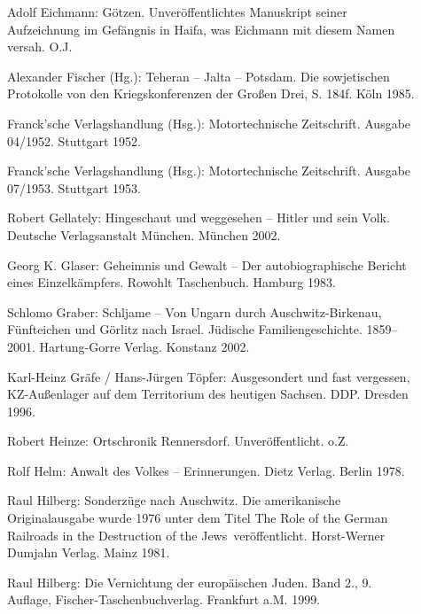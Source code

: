 \documentclass[a4paper,12pt,ngerman,
]{nisebook}
\begin{document}
\begin{description}
\item[]{Adolf Eichmann: \glqq Götzen\grqq. Unveröffentlichtes Manuskript seiner Aufzeichnung im Gefängnis in Haifa, was Eichmann mit diesem Namen versah. O.J.} 

\item[] {Alexander Fischer (Hg.): Teheran -- Jalta -- Potsdam. Die sowjetischen Protokolle von den Kriegskonferenzen der Großen Drei, S. 184f. Köln 1985.}

\item[]{Franck'sche Verlagshandlung (Hsg.): \glqq Motortechnische Zeitschrift\grqq. Ausgabe 04/1952. Stuttgart 1952.}

\item[]{Franck'sche Verlagshandlung (Hsg.): \glqq Motortechnische Zeitschrift\grqq. Ausgabe 07/1953. Stuttgart 1953.}

\item[]{Robert Gellately: \glqq Hingeschaut und weggesehen -- Hitler und sein Volk\grqq. Deutsche Verlagsanstalt München. München 2002.}

\item[]{Georg K. Glaser: \glqq Geheimnis und Gewalt -- Der autobiographische Bericht eines Einzelkämpfers\grqq. Rowohlt Taschenbuch. Hamburg 1983.}

\item[]{Schlomo Graber: \glqq Schljame -- Von Ungarn durch Auschwitz-Birkenau, Fünfteichen und Görlitz nach Israel. Jüdische Familiengeschichte. 1859--2001\grqq. Hartung-Gorre Verlag. Konstanz 2002.}

\item[]{Karl-Heinz Gräfe / Hans-Jürgen Töpfer: \glqq Ausgesondert und fast vergessen, KZ-Außenlager auf dem Territorium des heutigen Sachsen\grqq. DDP. Dresden 1996.}

\item[]{Robert Heinze: \glqq Ortschronik Rennersdorf\grqq. Unveröffentlicht. o.Z. }

\item[]{Rolf Helm: \glqq Anwalt des Volkes -- Erinnerungen\grqq. Dietz Verlag. Berlin 1978.}

\item[]{Raul Hilberg: \glqq Sonderzüge nach Auschwitz\grqq. Die amerikanische Originalausgabe wurde 1976 unter dem Titel \glqq The Role of the German Railroads in the Destruction of the Jews\grqq~veröffentlicht. Horst-Werner Dumjahn Verlag. Mainz 1981.}

\item[]{Raul Hilberg: \glqq Die Vernichtung der europäischen Juden\grqq. Band 2., 9. Auflage, Fischer-Taschenbuchverlag. Frankfurt a.M. 1999.}


\end{description}
\end{document}
